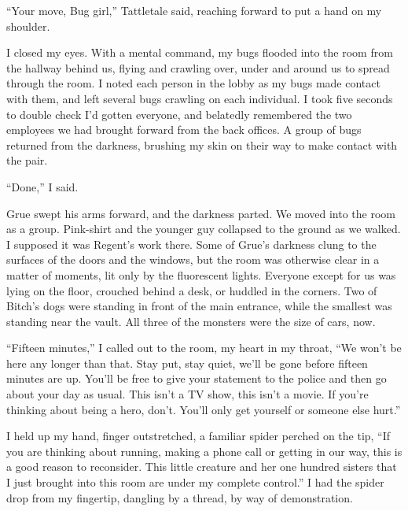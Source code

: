 ``Your move, Bug girl,'' Tattletale said, reaching forward to put a hand on my shoulder.



I closed my eyes.  With a mental command, my bugs flooded into the room from the hallway behind us, flying and crawling over, under and around us to spread through the room.  I noted each person in the lobby as my bugs made contact with them, and left several bugs crawling on each individual.  I took five seconds to double check I'd gotten everyone, and belatedly remembered the two employees we had brought forward from the back offices.  A group of bugs returned from the darkness, brushing my skin on their way to make contact with the pair.



``Done,'' I said.



Grue swept his arms forward, and the darkness parted.  We moved into the room as a group.  Pink-shirt and the younger guy collapsed to the ground as we walked.  I supposed it was Regent's work there.  Some of Grue's darkness clung to the surfaces of the doors and the windows, but the room was otherwise clear in a matter of moments, lit only by the fluorescent lights.  Everyone except for us was lying on the floor, crouched behind a desk, or huddled in the corners.  Two of Bitch's dogs were standing in front of the main entrance, while the smallest was standing near the vault.  All three of the monsters were the size of cars, now.



``Fifteen minutes,'' I called out to the room, my heart in my throat, ``We won't be here any longer than that.  Stay put, stay quiet, we'll be gone before fifteen minutes are up.  You'll be free to give your statement to the police and then go about your day as usual.  This isn't a TV show, this isn't a movie.  If you're thinking about being a hero, don't.  You'll only get yourself or someone else hurt.''



I held up my hand, finger outstretched, a familiar spider perched on the tip, ``If you are thinking about running, making a phone call or getting in our way, this is a good reason to reconsider.  This little creature and her one hundred sisters that I just brought into this room are under my complete control.''  I had the spider drop from my fingertip, dangling by a thread, by way of demonstration.



